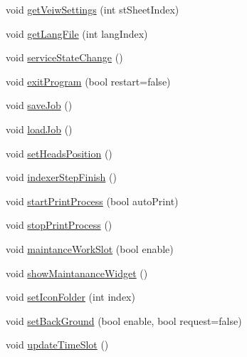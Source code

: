 \begin{DoxyCompactItemize}
\item 
void \mbox{\hyperlink{classMainWindow_ace96362adad45fba8ba98fa834ddb7f2}{get\+Veiw\+Settings}} (int st\+Sheet\+Index)
\item 
void \mbox{\hyperlink{classMainWindow_a96b56bd09db03ada451752dbbf993f12}{get\+Lang\+File}} (int lang\+Index)
\item 
void \mbox{\hyperlink{classMainWindow_a6390c39f77f17e86c59a4c8f8bf0e607}{service\+State\+Change}} ()
\item 
void \mbox{\hyperlink{classMainWindow_adb19747ac0579b12b268675c948dadeb}{exit\+Program}} (bool restart=false)
\item 
void \mbox{\hyperlink{classMainWindow_ae527207542e0df2d2aaa73d56fff003f}{save\+Job}} ()
\item 
void \mbox{\hyperlink{classMainWindow_afa9412b024ccb24c4299cc4ce4dd5327}{load\+Job}} ()
\item 
void \mbox{\hyperlink{classMainWindow_a5adab082570604b67b5a36479cc54121}{set\+Heads\+Position}} ()
\item 
void \mbox{\hyperlink{classMainWindow_a9ef526df9f964d8e10d8115a2cd10a28}{indexer\+Step\+Finish}} ()
\item 
void \mbox{\hyperlink{classMainWindow_a18d83d170a660644bb70fda6b28a2bc6}{start\+Print\+Process}} (bool auto\+Print)
\item 
void \mbox{\hyperlink{classMainWindow_a80282fbc6eb85c0f6594975e02a150a3}{stop\+Print\+Process}} ()
\item 
void \mbox{\hyperlink{classMainWindow_a5efe485c39e957ff3d4340328e4eb20d}{maintance\+Work\+Slot}} (bool enable)
\item 
void \mbox{\hyperlink{classMainWindow_ad8e2a953cbde0cc4ba7bc71567368029}{show\+Maintanance\+Widget}} ()
\item 
void \mbox{\hyperlink{classMainWindow_a1c07847e8f3adb976aa52cea3f032d7d}{set\+Icon\+Folder}} (int index)
\item 
void \mbox{\hyperlink{classMainWindow_aa08c1cb3f9e678d6af8f79dc2cc486d5}{set\+Back\+Ground}} (bool enable, bool request=false)
\item 
void \mbox{\hyperlink{classMainWindow_af9aa632b092ec3f2e86b62ceacc82a62}{update\+Time\+Slot}} ()
\end{DoxyCompactItemize}
